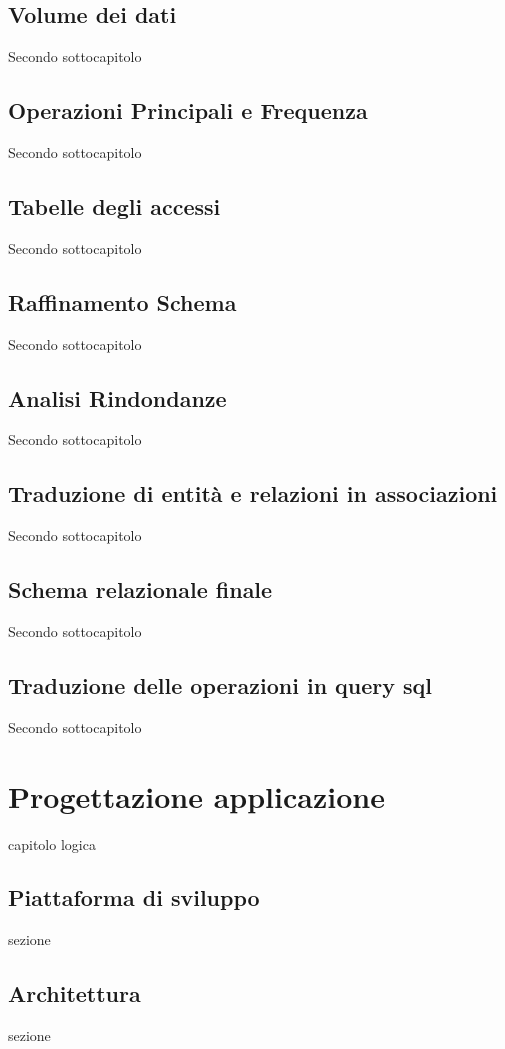 ﻿\documentclass[a4paper,12pt]{report}
\begin{document}
\section{Volume dei dati}
Secondo sottocapitolo
\section{Operazioni Principali e Frequenza}
Secondo sottocapitolo
\section{Tabelle degli accessi}
Secondo sottocapitolo
\section{Raffinamento Schema}
Secondo sottocapitolo
\section{Analisi Rindondanze}
Secondo sottocapitolo
\section{Traduzione di entità e relazioni in associazioni}
Secondo sottocapitolo
\section{Schema relazionale finale}
Secondo sottocapitolo
\section{Traduzione delle operazioni in query sql}
Secondo sottocapitolo


\chapter{Progettazione applicazione}
capitolo logica
\section{Piattaforma di sviluppo}
sezione
\section{Architettura}
sezione
\end{document}
